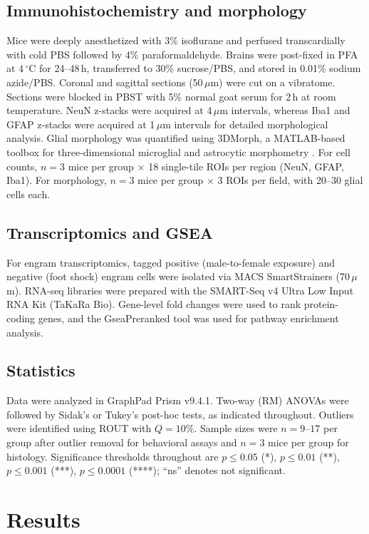 \documentclass[11pt]{article}
\begin{document}
\subsection{Immunohistochemistry and morphology}
Mice were deeply anesthetized with 3\% isoflurane and perfused transcardially with cold PBS followed by 4\% paraformaldehyde. Brains were post-fixed in PFA at $4\,^{\circ}\mathrm{C}$ for 24--48\,h, transferred to 30\% sucrose/PBS, and stored in 0.01\% sodium azide/PBS. Coronal and sagittal sections (50\,$\mu$m) were cut on a vibratome. Sections were blocked in PBST with 5\% normal goat serum for 2\,h at room temperature. NeuN z-stacks were acquired at 4\,$\mu$m intervals, whereas Iba1 and GFAP z-stacks were acquired at 1\,$\mu$m intervals for detailed morphological analysis. Glial morphology was quantified using 3DMorph, a MATLAB-based toolbox for three-dimensional microglial and astrocytic morphometry \citep{york2018threedmorph}. For cell counts, $n=3$ mice per group $\times$ 18 single-tile ROIs per region (NeuN, GFAP, Iba1). For morphology, $n=3$ mice per group $\times$ 3 ROIs per field, with 20--30 glial cells each.

\subsection{Transcriptomics and GSEA}
For engram transcriptomics, tagged positive (male-to-female exposure) and negative (foot shock) engram cells were isolated via MACS SmartStrainers (70\,$\mu$m). RNA-seq libraries were prepared with the SMART-Seq v4 Ultra Low Input RNA Kit (TaKaRa Bio). Gene-level fold changes were used to rank protein-coding genes, and the GseaPreranked tool was used for pathway enrichment analysis.

\subsection{Statistics}
Data were analyzed in GraphPad Prism v9.4.1. Two-way (RM) ANOVAs were followed by Sidak's or Tukey's post-hoc tests, as indicated throughout. Outliers were identified using ROUT with $Q=10\%$. Sample sizes were $n=9$--$17$ per group after outlier removal for behavioral assays and $n=3$ mice per group for histology. Significance thresholds throughout are $p \leq 0.05$ (*), $p \leq 0.01$ (**), $p \leq 0.001$ (***), $p \leq 0.0001$ (****); ``ns'' denotes not significant.

\section{Results}
\end{document}
